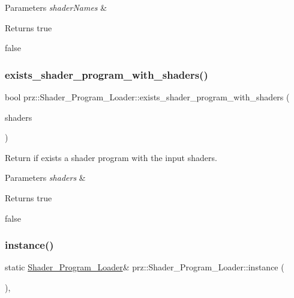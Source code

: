 \begin{DoxyParams}{Parameters}
{\em shader\+Names} & \\
\hline
\end{DoxyParams}
\begin{DoxyReturn}{Returns}
true 

false 
\end{DoxyReturn}
\mbox{\label{classprz_1_1_shader___program___loader_abd5dbe883d8585c87fade3b2bad85f05}} 
\subsubsection{\texorpdfstring{exists\_shader\_program\_with\_shaders()}{exists\_shader\_program\_with\_shaders()}\hspace{0.1cm}{\footnotesize\ttfamily [2/2]}}
{\footnotesize\ttfamily bool prz\+::\+Shader\+\_\+\+Program\+\_\+\+Loader\+::exists\+\_\+shader\+\_\+program\+\_\+with\+\_\+shaders (\begin{DoxyParamCaption}\item[{P\+Buffer$<$ P\+S\+Ptr$<$ \mbox{\hyperlink{classprz_1_1_shader}{Shader}} $>$ $>$ \&}]{shaders }\end{DoxyParamCaption})\hspace{0.3cm}{\ttfamily [inline]}}



Return if exists a shader program with the input shaders. 


\begin{DoxyParams}{Parameters}
{\em shaders} & \\
\hline
\end{DoxyParams}
\begin{DoxyReturn}{Returns}
true 

false 
\end{DoxyReturn}
\mbox{\label{classprz_1_1_shader___program___loader_a53c57a4fe69fe9b343124d7d6e0c373c}} 
\subsubsection{\texorpdfstring{instance()}{instance()}}
{\footnotesize\ttfamily static \mbox{\hyperlink{classprz_1_1_shader___program___loader}{Shader\+\_\+\+Program\+\_\+\+Loader}}\& prz\+::\+Shader\+\_\+\+Program\+\_\+\+Loader\+::instance (\begin{DoxyParamCaption}{ }\end{DoxyParamCaption})\hspace{0.3cm}{\ttfamily [inline]}, {\ttfamily [static]}}



